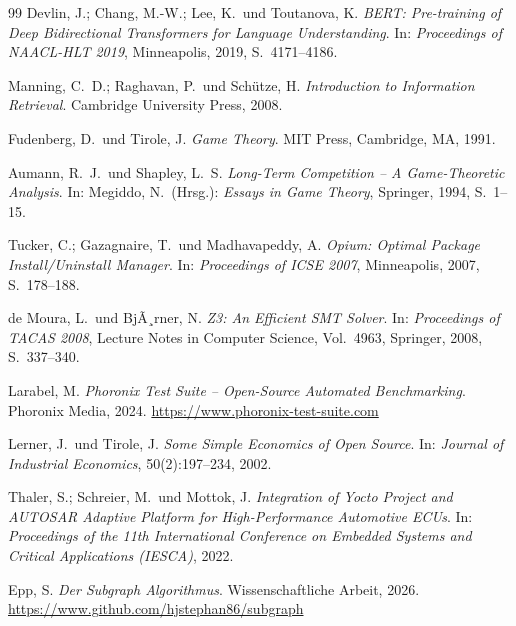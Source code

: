 ﻿\documentclass[a4paper,12pt]{article}
\theoremstyle{definition}
\begin{document}
\begin{thebibliography}{99}
Devlin, J.; Chang, M.-W.; Lee, K.\ und Toutanova, K.
\textit{BERT: Pre-training of Deep Bidirectional Transformers for Language Understanding}.
In: \textit{Proceedings of NAACL-HLT 2019}, Minneapolis, 2019, S.\ 4171--4186.

Manning, C.\ D.; Raghavan, P.\ und Schütze, H.
\textit{Introduction to Information Retrieval}.
Cambridge University Press, 2008.

Fudenberg, D.\ und Tirole, J.
\textit{Game Theory}.
MIT Press, Cambridge, MA, 1991.

Aumann, R.\ J.\ und Shapley, L.\ S.
\textit{Long-Term Competition -- A Game-Theoretic Analysis}.
In: Megiddo, N.\ (Hrsg.): \textit{Essays in Game Theory}, Springer, 1994, S.\ 1--15.

Tucker, C.; Gazagnaire, T.\ und Madhavapeddy, A.
\textit{Opium: Optimal Package Install/Uninstall Manager}.
In: \textit{Proceedings of ICSE 2007}, Minneapolis, 2007, S.\ 178--188.

de Moura, L.\ und BjÃ¸rner, N.
\textit{Z3: An Efficient SMT Solver}.
In: \textit{Proceedings of TACAS 2008}, Lecture Notes in Computer Science, Vol.\ 4963,
Springer, 2008, S.\ 337--340.

Larabel, M.
\textit{Phoronix Test Suite -- Open-Source Automated Benchmarking}.
Phoronix Media, 2024.
\url{https://www.phoronix-test-suite.com}

Lerner, J.\ und Tirole, J.
\textit{Some Simple Economics of Open Source}.
In: \textit{Journal of Industrial Economics}, 50(2):197--234, 2002.

Thaler, S.; Schreier, M.\ und Mottok, J.
\textit{Integration of Yocto Project and AUTOSAR Adaptive Platform for
High-Performance Automotive ECUs}.
In: \textit{Proceedings of the 11th International Conference on Embedded Systems
and Critical Applications (IESCA)}, 2022.

Epp, S.
\textit{Der Subgraph Algorithmus}.
Wissenschaftliche Arbeit, 2026.
\url{https://www.github.com/hjstephan86/subgraph}

\end{thebibliography}
\end{document}
